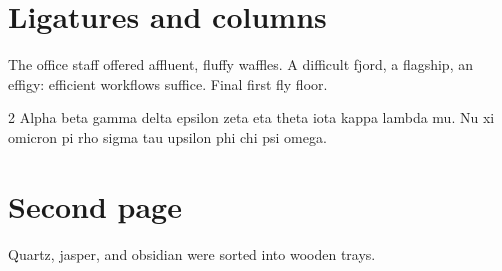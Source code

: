 \documentclass[11pt]{article}
\begin{document}
\section*{Ligatures and columns}
The office staff offered affluent, fluffy waffles. A difficult fjord, a flagship, an effigy:
efficient workflows suffice. Final first fly floor.

\begin{multicols}{2}
Alpha beta gamma delta epsilon zeta eta theta iota kappa lambda mu.
\columnbreak
Nu xi omicron pi rho sigma tau upsilon phi chi psi omega.
\end{multicols}

\newpage
\section*{Second page}
Quartz, jasper, and obsidian were sorted into wooden trays.
\end{document}
